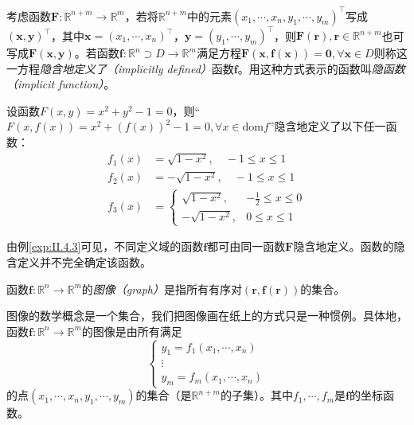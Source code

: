 \documentclass[main.tex]{subfiles}
\begin{document}
\begin{definition}[隐函数]\label{def:II.4.2}
    考虑函数$\mathbf{F}:\mathbb{R}^{n+m}\rightarrow\mathbb{R}^m$，若将$\mathbb{R}^{n+m}$中的元素$\left(x_1,\cdots,x_n,y_1,\cdots,y_m\right)^\intercal$写成$\left(\mathbf{x},\mathbf{y}\right)^\intercal$，其中$\mathbf{x}=\left(x_1,\cdots,x_n\right)^\intercal$，$\mathbf{y}=\left(y_1,\cdots,y_m\right)^\intercal$，则$\mathbf{F}\left(\mathbf{r}\right),\mathbf{r}\in\mathbb{R}^{n+m}$也可写成$\mathbf{F}\left(\mathbf{x},\mathbf{y}\right)$。若函数$\mathbf{f}:\mathbb{R}^n\supset D\rightarrow\mathbb{R}^m$满足方程$\mathbf{F}\left(\mathbf{x},\mathbf{f}\left(\mathbf{x}\right)\right)=\mathbf{0},\forall\mathbf{x}\in D$则称这一方程\emph{隐含地定义了（implicitly defined）}函数$\mathbf{f}$。用这种方式表示的函数叫\emph{隐函数（implicit function）}。
\end{definition}

\begin{example}\label{exp:II.4.3}
    设函数$F\left(x,y\right)=x^2+y^2-1=0$，则“$F\left(x,f\left(x\right)\right)=x^2+\left(f\left(x\right)\right)^2-1=0,\forall x\in\mathrm{dom}f$”隐含地定义了以下任一函数：
    \begin{align*}
        f_1\left(x\right) & =\sqrt{1-x^2},\quad -1\leq x\leq 1                \\
        f_2\left(x\right) & =-\sqrt{1-x^2},\quad -1\leq x\leq 1               \\
        f_3\left(x\right) & =\left\{\begin{array}{ll}
                                        \sqrt{1-x^2},  & -\frac{1}{2}\leq x\leq 0 \\
                                        -\sqrt{1-x^2}, & 0\leq x\leq 1
                                    \end{array}\right.
    \end{align*}
\end{example}
由例\ref{exp:II.4.3}可见，不同定义域的函数$\mathbf{f}$都可由同一函数$\mathbf{F}$隐含地定义。函数的隐含定义并不完全确定该函数。

\begin{definition}[函数的图像]\label{def:II.4.3}
    函数$\mathbf{f}:\mathbb{R}^n\rightarrow\mathbb{R}^m$的\emph{图像（graph）}是指所有有序对$\left(\mathbf{r},\mathbf{f}\left(\mathbf{r}\right)\right)$的集合\cite[\S 6.4$\sim$6.7]{华工高数2009上}。
\end{definition}

图像的数学概念是一个集合，我们把图像画在纸上的方式只是一种惯例。具体地，函数$\mathbf{f}:\mathbb{R}^n\rightarrow\mathbb{R}^m$的图像是由所有满足
\[
    \left\{\begin{array}{c}y_1=f_1\left(x_1,\cdots,x_n\right)\\\vdots\\y_m=f_m\left(x_1,\cdots,x_n\right)\end{array}\right.
\]
的点$\left(x_1,\cdots,x_n,y_1,\cdots,y_m\right)$的集合（是$\mathbb{R}^{n+m}$的子集）。其中$f_1,\cdots,f_m$是$\mathbf{f}$的坐标函数。
\end{document}
